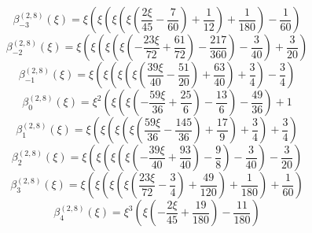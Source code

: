 \begin{equation}
\beta_{-3}^{(2,8)} (\xi) =
 \xi \left(\xi \left(\xi \left(\xi \left(\frac{2 \xi}{45}
 - \frac{7}{60}\right) + \frac{1}{12}\right) + \frac{1}{180}\right) - \frac{1}{60}\right)
\end{equation}
\begin{equation}
\beta_{-2}^{(2,8)} (\xi) =
 \xi \left(\xi \left(\xi \left(\xi \left(- \frac{23 \xi}{72}
 + \frac{61}{72}\right) - \frac{217}{360}\right) - \frac{3}{40}\right) + \frac{3}{20}\right)
\end{equation}
\begin{equation}
\beta_{-1}^{(2,8)} (\xi) =
 \xi \left(\xi \left(\xi \left(\xi \left(\frac{39 \xi}{40}
 - \frac{51}{20}\right) + \frac{63}{40}\right) + \frac{3}{4}\right) - \frac{3}{4}\right)
\end{equation}
\begin{equation}
\beta_{0}^{(2,8)} (\xi) =
 \xi^{2} \left(\xi \left(\xi \left(- \frac{59 \xi}{36}
 + \frac{25}{6}\right) - \frac{13}{6}\right) - \frac{49}{36}\right) + 1
\end{equation}
\begin{equation}
\beta_{1}^{(2,8)} (\xi) =
 \xi \left(\xi \left(\xi \left(\xi \left(\frac{59 \xi}{36}
 - \frac{145}{36}\right) + \frac{17}{9}\right) + \frac{3}{4}\right) + \frac{3}{4}\right)
\end{equation}
\begin{equation}
\beta_{2}^{(2,8)} (\xi) =
 \xi \left(\xi \left(\xi \left(\xi \left(- \frac{39 \xi}{40}
 + \frac{93}{40}\right) - \frac{9}{8}\right) - \frac{3}{40}\right) - \frac{3}{20}\right)
\end{equation}
\begin{equation}
\beta_{3}^{(2,8)} (\xi) =
 \xi \left(\xi \left(\xi \left(\xi \left(\frac{23 \xi}{72}
 - \frac{3}{4}\right) + \frac{49}{120}\right) + \frac{1}{180}\right) + \frac{1}{60}\right)
\end{equation}
\begin{equation}
\beta_{4}^{(2,8)} (\xi) =
 \xi^{3} \left(\xi \left(- \frac{2 \xi}{45} + \frac{19}{180}\right) - \frac{11}{180}\right)
\end{equation}

